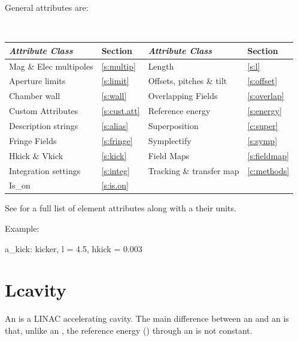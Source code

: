 General  attributes are:
\begin{center}
\tt
\begin{tabular}{llll} \toprule
  {\sl Attribute Class}      & Section           & {\sl Attribute Class}      & Section          \\ \midrule
  Mag \& Elec multipoles     & \ref{s:multip}    & Length                     & \ref{s:l}        \\
  Aperture limits            & \ref{s:limit}     & Offsets, pitches \& tilt   & \ref{s:offset}   \\
  Chamber wall               & \ref{s:wall}      & Overlapping Fields         & \ref{s:overlap}  \\
  Custom Attributes          & \ref{s:cust.att}  & Reference energy           & \ref{s:energy}   \\ 
  Description strings        & \ref{s:alias}     & Superposition              & \ref{c:super}    \\
  Fringe Fields              & \ref{s:fringe}    & Symplectify                & \ref{s:symp}     \\
  Hkick \& Vkick             & \ref{s:kick}      & Field Maps                 & \ref{s:fieldmap} \\
  Integration settings       & \ref{s:integ}     & Tracking \& transfer map   & \ref{c:methods}  \\ 
  Is_on                      & \ref{s:is.on}     &                            &                  \\
  \bottomrule
\end{tabular}
\end{center}
\toffset
See  for a full list of element attributes along with a their units.

Example:
\begin{example}
  a_kick: kicker, l = 4.5, hkick = 0.003
\end{example}

\newpage

\section{Lcavity}
\label{s:lcav}

An  is a LINAC accelerating cavity.  The main difference between an  and an
 is that, unlike an , the reference energy () through
an  is not constant.

